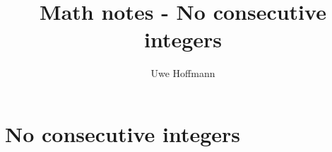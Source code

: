 

\title{Math notes - No consecutive integers}
\author{Uwe Hoffmann}



\setcounter{chapter}{0}
\chapter{No consecutive integers}
